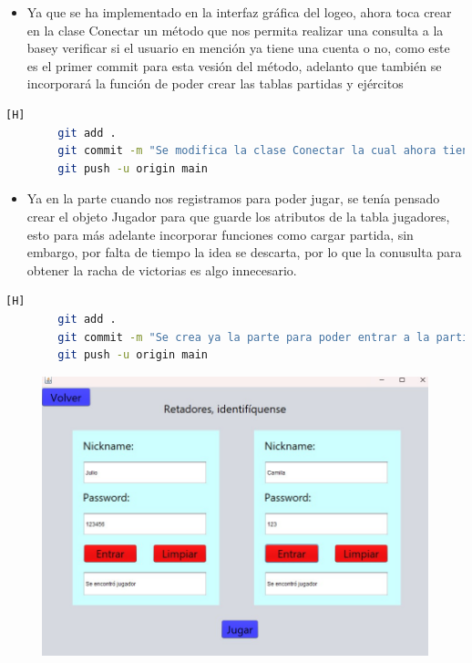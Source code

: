 \documentclass{article}
\begin{document}
	
	\begin{itemize}
	\item Ya que se ha implementado en la interfaz gráfica del logeo, ahora toca crear en la clase Conectar un método que nos permita realizar una consulta a la basey verificar si el usuario en mención ya tiene una cuenta o no, como este es el primer commit para esta vesión del método, adelanto que también se incorporará la función de poder crear las tablas partidas y ejércitos 
	\end{itemize}
	
	
	
	\begin{lstlisting}[language=bash,caption={Commit: 962b10dee42f6ec69b35431ea5b3b76094dbd215 }][H]
		git add .
		git commit -m "Se modifica la clase Conectar la cual ahora tiene un metodo para obtener las victorias, ademas se hacen leves cambios en la clase para hacer las consultas"			
		git push -u origin main
	\end{lstlisting}
	
	
	\begin{itemize}
	\item Ya en la parte cuando nos registramos para poder jugar, se tenía pensado crear el objeto Jugador para que guarde los atributos de la tabla jugadores, esto para más adelante incorporar funciones como cargar partida, sin embargo, por falta de tiempo la idea se descarta, por lo que la conusulta para obtener la racha de victorias es algo innecesario. 
	\end{itemize}
	
	
	
	
	\begin{lstlisting}[language=bash,caption={Commit: fde297f82a2db07850d0ebfb414669aee7afef58 }][H]
		git add .
		git commit -m "Se crea ya la parte para poder entrar a la partida,es decir se edita la clase Personalize"			
		git push -u origin main
	\end{lstlisting}
	
	\begin{figure}[H]
	\centering
	\includegraphics[width=1\textwidth,keepaspectratio]{img/entrar.jpg}
\end{figure}
\end{document}
